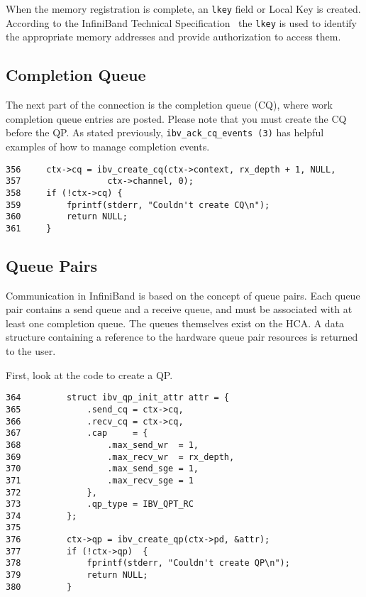 \documentclass[letterpaper,12pt]{article}
\begin{document}
When the memory registration is complete, an {\tt lkey} field
or Local Key is created. According to the InfiniBand Technical
Specification~\cite[Page~76]{spec} the {\tt lkey} is used to identify
the appropriate memory addresses and provide authorization to access them.

\subsection{Completion Queue} The next part of the connection is the
completion queue (CQ), where work completion queue entries are posted.
Please note that you must create the CQ before the QP. As stated
previously, {\tt ibv\_ack\_cq\_events (3)} has helpful examples of how to
manage completion events.

\lstset{language=C, caption=Creating a CQ}
\begin{lstlisting}
356     ctx->cq = ibv_create_cq(ctx->context, rx_depth + 1, NULL,
357                 ctx->channel, 0);
358     if (!ctx->cq) {
359         fprintf(stderr, "Couldn't create CQ\n");
360         return NULL;
361     }
\end{lstlisting}

\subsection{Queue Pairs} Communication in InfiniBand is based on the
concept of queue pairs. Each queue pair contains a send queue and
a receive queue, and must be associated with at least one completion
queue. The queues themselves exist on the HCA. A data structure containing
a reference to the hardware queue pair resources is returned to the user.

First, look at the code to create a QP.

\lstset{language=C, caption=Creating a QP}
\begin{lstlisting}
364         struct ibv_qp_init_attr attr = {
365             .send_cq = ctx->cq,
366             .recv_cq = ctx->cq,
367             .cap     = {
368                 .max_send_wr  = 1,
369                 .max_recv_wr  = rx_depth,
370                 .max_send_sge = 1,
371                 .max_recv_sge = 1
372             },
373             .qp_type = IBV_QPT_RC
374         };
375
376         ctx->qp = ibv_create_qp(ctx->pd, &attr);
377         if (!ctx->qp)  {
378             fprintf(stderr, "Couldn't create QP\n");
379             return NULL;
380         }
\end{lstlisting}
\end{document}
